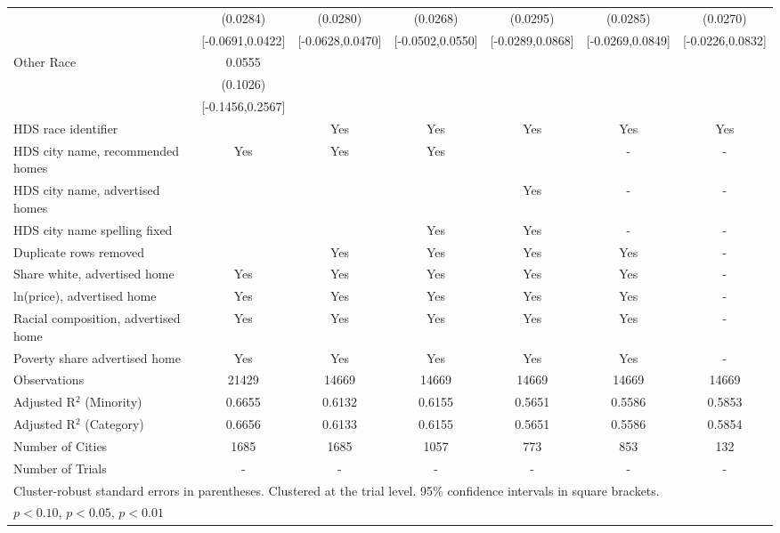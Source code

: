 \begin{table}[htbp]
{\begin{tabular}{l*{6}{c}}
 & (0.0284) & (0.0280) & (0.0268) & (0.0295) & (0.0285) & (0.0270) \\
 & [-0.0691,0.0422] & [-0.0628,0.0470] & [-0.0502,0.0550] & [-0.0289,0.0868] & [-0.0269,0.0849] & [-0.0226,0.0832] \\
Other Race & 0.0555 &  &  &  &  &  \\
 & (0.1026) &  &  &  &  &  \\
 & [-0.1456,0.2567] &  &  &  &  &  \\
\midrule
HDS race identifier & & Yes & Yes & Yes & Yes & Yes \\
HDS city name, recommended homes & Yes & Yes & Yes & & - & -\\
HDS city name, advertised homes &  &  &  & Yes & - & -\\
HDS city name spelling fixed & & & Yes & Yes & - & -\\
Duplicate rows removed &  & Yes & Yes & Yes & Yes & - \\
\midrule
Share white, advertised home  & Yes & Yes & Yes & Yes & Yes & - \\
ln(price), advertised home  & Yes & Yes & Yes & Yes & Yes & - \\
Racial composition, advertised home & Yes & Yes & Yes & Yes & Yes & - \\
Poverty share advertised home & Yes & Yes & Yes & Yes & Yes & - \\
Observations & 21429 & 14669 & 14669 & 14669 & 14669 & 14669 \\
Adjusted R$^2$ (Minority) & 0.6655 & 0.6132 & 0.6155 & 0.5651 & 0.5586 & 0.5853 \\
Adjusted R$^2$ (Category) & 0.6656 & 0.6133 & 0.6155 & 0.5651 & 0.5586 & 0.5854 \\
Number of Cities & 1685 & 1685 & 1057 & 773 & 853 & 132 \\
Number of Trials & - & - & - & - & - & - \\
\bottomrule
\multicolumn{7}{l}{\footnotesize Cluster-robust standard errors in parentheses. Clustered at the trial level. 95\% confidence intervals in square brackets.}\\
\multicolumn{7}{l}{\footnotesize \sym{*} \(p<0.10\), \sym{**} \(p<0.05\), \sym{***} \(p<0.01\)}\\
\end{tabular}
}
\end{table}
